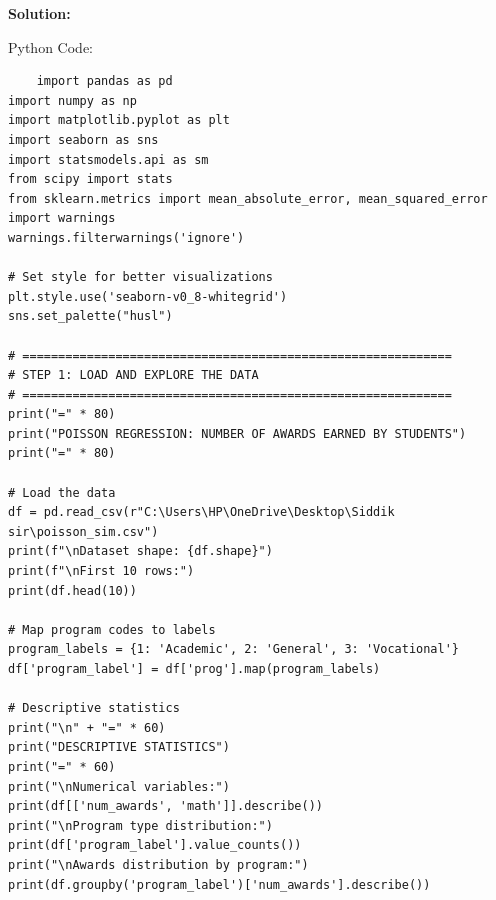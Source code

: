 \documentclass[12pt]{article}
\begin{document}
{\large\textbf{Solution:}}

\vspace{0.1cm}

{\large{Python Code:}}

\vspace{0.2cm}

\begin{verbatim}
    import pandas as pd
import numpy as np
import matplotlib.pyplot as plt
import seaborn as sns
import statsmodels.api as sm
from scipy import stats
from sklearn.metrics import mean_absolute_error, mean_squared_error
import warnings
warnings.filterwarnings('ignore')

# Set style for better visualizations
plt.style.use('seaborn-v0_8-whitegrid')
sns.set_palette("husl")

# ============================================================
# STEP 1: LOAD AND EXPLORE THE DATA
# ============================================================
print("=" * 80)
print("POISSON REGRESSION: NUMBER OF AWARDS EARNED BY STUDENTS")
print("=" * 80)

# Load the data
df = pd.read_csv(r"C:\Users\HP\OneDrive\Desktop\Siddik sir\poisson_sim.csv")
print(f"\nDataset shape: {df.shape}")
print(f"\nFirst 10 rows:")
print(df.head(10))

# Map program codes to labels
program_labels = {1: 'Academic', 2: 'General', 3: 'Vocational'}
df['program_label'] = df['prog'].map(program_labels)

# Descriptive statistics
print("\n" + "=" * 60)
print("DESCRIPTIVE STATISTICS")
print("=" * 60)
print("\nNumerical variables:")
print(df[['num_awards', 'math']].describe())
print("\nProgram type distribution:")
print(df['program_label'].value_counts())
print("\nAwards distribution by program:")
print(df.groupby('program_label')['num_awards'].describe())
\end{verbatim}
\vspace{0.1cm}
\end{document}
